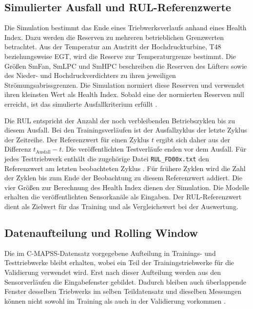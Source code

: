 \subsection{Simulierter Ausfall und RUL-Referenzwerte}

Die Simulation bestimmt das Ende eines Triebwerksverlaufs anhand eines Health Index. Dazu werden die Reserven zu mehreren betrieblichen Grenzwerten betrachtet. Aus der Temperatur am Austritt der Hochdruckturbine, T48 beziehungsweise EGT, wird die Reserve zur Temperaturgrenze bestimmt. Die Größen SmFan, SmLPC und SmHPC beschreiben die Reserven des Lüfters sowie des Nieder- und Hochdruckverdichters zu ihren jeweiligen Strömungsabrissgrenzen. Die Simulation normiert diese Reserven und verwendet ihren kleinsten Wert als Health Index. Sobald eine der normierten Reserven null erreicht, ist das simulierte Ausfallkriterium erfüllt \parencite[3, 6--7]{saxenaDamagePropagationModeling}.

Die \ac{RUL} entspricht der Anzahl der noch verbleibenden Betriebszyklen bis zu diesem Ausfall. Bei den Trainingsverläufen ist der Ausfallzyklus der letzte Zyklus der Zeitreihe. Der Referenzwert für einen Zyklus $t$ ergibt sich daher aus der Differenz $t_{\mathrm{Ausfall}}-t$. Die veröffentlichten Testverläufe enden vor dem Ausfall. Für jedes Testtriebwerk enthält die zugehörige Datei \texttt{RUL\_FD00x.txt} den Referenzwert am letzten beobachteten Zyklus \parencites[7]{saxenaDamagePropagationModeling}{nasaCmapssJetEngineData2022}. Für frühere Zyklen wird die Zahl der Zyklen bis zum Ende der Beobachtung zu diesem Referenzwert addiert. Die vier Größen zur Berechnung des Health Index dienen der Simulation. Die Modelle erhalten die veröffentlichten Sensorkanäle als Eingaben. Der \ac{RUL}-Referenzwert dient als Zielwert für das Training und als Vergleichswert bei der Auswertung.

\subsection{Datenaufteilung und Rolling Window}

Die im C-MAPSS-Datensatz vorgegebene Aufteilung in Trainings- und Testtriebwerke bleibt erhalten, wobei ein Teil der Trainingstriebwerke für die Validierung verwendet wird. Erst nach dieser Aufteilung werden aus den Sensorverläufen die Eingabefenster gebildet. Dadurch bleiben auch überlappende Fenster desselben Triebwerks im selben Teildatensatz und dieselben Messungen können nicht sowohl im Training als auch in der Validierung vorkommen \parencite[4--5]{kapoorLeakageReproducibilityCrisis2023}.

